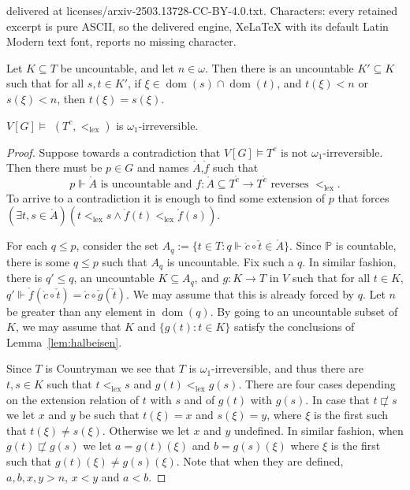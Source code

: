 \documentclass[10pt,a4paper]{amsart}
\DeclareMathOperator{\dom}{dom}
\newcommand\lex{\mathrm{lex}}
\newcommand{\ck}[1]{\check{#1}}
\newcommand{\dt}[1]{\mathring{#1}}
\newcommand{\seb}{\subseteq}
\newcommand{\tle}{\sqsubset}
\renewcommand{\P}{\mathbb{P}}
\begin{document}
delivered at licenses/arxiv-2503.13728-CC-BY-4.0.txt. Characters: every retained excerpt is pure ASCII, so the delivered engine, XeLaTeX with its default Latin Modern text font, reports no missing character.
\begin{lemma}\label{lem:halbeisen}
  Let $K \seb T$ be uncountable, and let $n \in \omega$. Then
  there is an uncountable $K' \seb K$ such that
  for all $s,t \in K'$, if $\xi \in \dom(s) \cap \dom(t)$,
  and $t(\xi) < n$ or $s(\xi) <n$, then $t(\xi) = s(\xi)$.
\end{lemma}

\begin{proposition}
  $V[G] \models$ $(T^{c},<_{\lex})$ is $\omega_{1}$-irreversible.
\end{proposition}

\begin{proof}
  Suppose towards a contradiction
  that $V[G] \models T^{c} \text{ is not $\omega_{1}$-irreversible}$.
  Then there must be $p \in G$ and names $\dt{A}$,$\dt{f}$ such
  that
  \[p \Vdash \dt{A} \text{ is uncountable and }
    f : \dt{A} \seb T^{\dt{c}} \to T^{\dt{c}} \text{ reverses } <_{\lex}.\]
  To arrive to a contradiction it is enough to find some extension
  of $p$ that forces
  $(\exists t,s \in \dt{A})(t <_{\lex} s \land \dt{f}(t) <_{\lex} \dt{f}(s))$.

  For each $q \le p$, consider the
  set $A_{q} := \{t \in T : q \Vdash \dt{c} \circ \ck{t} \in \dt{A}\}$. Since $\P$ is
  countable, there is some $q \le p$ such that $A_{q}$ is uncountable. Fix such a $q$.
  In similar fashion, there is $q' \le q$, an uncountable $K \seb A_{q}$,
  and $g : K \to T$ in $V$ such that for all $t \in K$,
  $q' \Vdash \dt{f}(\dt{c} \circ \ck{t}) = \dt{c} \circ \ck{g}(\ck{t})$. We may
  assume that this is already forced by $q$. Let $n$ be greater
  than any element in $\dom(q)$. By going to an uncountable
  subset of $K$, we may assume that $K$ and $\{g(t) : t \in K\}$ satisfy
  the conclusions of Lemma~\ref{lem:halbeisen}.

  Since $T$ is Countryman we see that $T$ is
  $\omega_{1}$-irreversible, and thus there are $t,s \in K$
  such that $t <_{\lex} s$ and $g(t) <_{\lex} g(s)$. There are four
  cases depending on the extension relation of $t$ with $s$ and
  of $g(t)$ with $g(s)$. In
  case that $t \not\tle s$ we let $x$ and $y$ be such that
  $t(\xi) = x$ and $s(\xi) = y$, where $\xi$ is the first such that
  $t(\xi) \neq s(\xi)$. Otherwise we let $x$ and $y$ undefined.
  In similar fashion, when $g(t) \not\tle g(s)$
  we let $a = g(t)(\xi)$ and $b = g(s)(\xi)$ where
  $\xi$ is the first such that $g(t)(\xi) \neq g(s)(\xi)$.
  Note that when they are defined,
  $a,b,x,y > n$, $x < y$ and $a < b$.


\end{proof}
\end{document}
